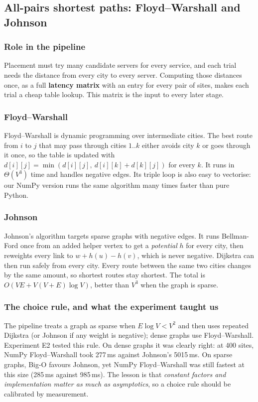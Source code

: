 \subsection{All-pairs shortest paths: Floyd--Warshall and Johnson}
\subsubsection{Role in the pipeline}
Placement must try many candidate servers for every service, and each trial needs the distance from every city to every server. Computing those distances once, as a full \textbf{latency matrix} with an entry for every pair of sites, makes each trial a cheap table lookup. This matrix is the input to every later stage.

\subsubsection{Floyd--Warshall}
Floyd--Warshall \cite{floyd1962} is dynamic programming over intermediate cities. The best route from $i$ to $j$ that may pass through cities $1..k$ either avoids city $k$ or goes through it once, so the table is updated with \(d[i][j] = \min(d[i][j],\ d[i][k] + d[k][j])\) for every $k$. It runs in $\Theta(V^3)$ time and handles negative edges. Its triple loop is also easy to vectorise: our NumPy version runs the same algorithm many times faster than pure Python.

\subsubsection{Johnson}
Johnson's algorithm \cite{johnson1977} targets sparse graphs with negative edges. It runs Bellman-Ford once from an added helper vertex to get a \emph{potential} $h$ for every city, then reweights every link to $w + h(u) - h(v)$, which is never negative. Dijkstra can then run safely from every city. Every route between the same two cities changes by the same amount, so shortest routes stay shortest. The total is $O(VE + V(V+E)\log V)$, better than $V^3$ when the graph is sparse.

\subsubsection{The choice rule, and what the experiment taught us}
The pipeline treats a graph as sparse when $E\log V < V^2$ and then uses repeated Dijkstra (or Johnson if any weight is negative); dense graphs use Floyd--Warshall. Experiment E2 tested this rule. On dense graphs it was clearly right: at 400 sites, NumPy Floyd--Warshall took 277\,ms against Johnson's 5015\,ms. On sparse graphs, Big-O favours Johnson, yet NumPy Floyd--Warshall was still fastest at this size (285\,ms against 985\,ms). The lesson is that \emph{constant factors and implementation matter as much as asymptotics}, so a choice rule should be calibrated by measurement.


